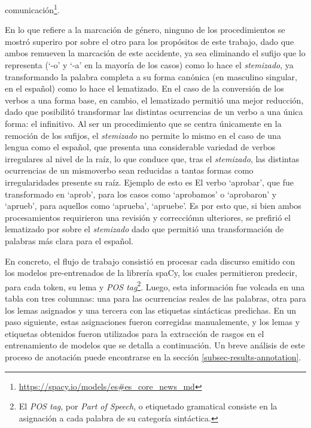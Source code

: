 comunicación\footnote{\url{https://spacy.io/models/es\#es_core_news_md}}.
\par
En lo que refiere a la marcación de género, ninguno de los procedimientos se mostró
superiro por sobre el otro para los propósitos de este trabajo, dado que ambos
remueven la marcación de este accidente, ya sea eliminando el sufijo que lo
representa (`-o' y `-a' en la mayoría de los casos) como lo hace el
\textit{stemizado}, ya transformando la palabra completa a su forma canónica
(en masculino singular, en el español) como lo hace el lematizado. En el caso
de la conversión de los verbos a una forma base, en cambio, el lematizado permitió
una mejor reducción, dado que posibilitó transformar las distintas ocurrencias
de un verbo a una única forma: el infinitivo. Al ser un procedimiento que se
centra únicamente en la remoción de los sufijos, el \textit{stemizado} no permite
lo mismo en el caso de una lengua como el español, que presenta una considerable
variedad de verbos irregulares al nivel de la raíz, lo que conduce que, tras el
\textit{stemizado}, las distintas ocurrencias de un mismoverbo sean reducidas
a tantas formas como irregularidades presente su raíz. Ejemplo de esto es El
verbo `aprobar', que fue transformado en `aprob', para los casos como
`aprobamos' o `aprobaron' y `aprueb', para aquellos como `aprueba',
`apruebe'. Es por esto que, si bien ambos procesamientos requirieron una revisión
y correcciómn ulteriores, se prefirió el lematizado por sobre el \textit{stemizado}
dado que permitió una transformación de palabras más clara para el español.
\par
En concreto, el flujo de trabajo consistió en procesar cada discurso emitido
con los modelos pre-entrenados de la librería spaCy, los cuales permitieron
predecir, para cada token, su lema y \textit{POS tag}\footnote{El
\textit{POS tag}, por \textit{Part of Speech}, o etiquetado gramatical consiste
en la asignación a cada palabra de su categoría sintáctica.}. Luego, esta
información fue volcada en una tabla con tres columnas: una para las ocurrencias
reales de las palabras, otra para los lemas asignados y una tercera con las etiquetas
sintácticas predichas. En un paso siguiente, estas asignaciones fueron corregidas
manualemente, y los lemas y etiquetas obtenidos fueron utilizados para la
extracción de rasgos en el entrenamiento de modelos que se detalla a continuación.
Un breve análisis de este proceso de anotación puede encontrarse en la sección
\ref{subsec-results-annotation}.